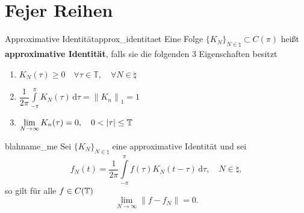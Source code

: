 \section{Fejer Reihen}

\begin{boringDef}{Approximative Identität}{approx_identitaet}
  Eine Folge ${\{K_{N}\}}_{N\in\natural} \subset C(\pi)$ heißt \textbf{approximative Identität}, falls sie die folgenden 3 Eigenschaften besitzt
  \begin{enumerate}
          \item $K_{N}(\tau) \geq 0 \quad \forall \tau\in\mathbb{T}, \quad \forall N \in \natural$
          \item $\dfrac{1}{2\pi} \int\limits_{-\pi}^{\pi} K_{N}(\tau) \, \mathrm{d}\tau = {\|K_{n}\|}_{1} = 1$
          \item $\lim\limits_{N\to\infty} K_{n}(\tau) = 0, \quad 0 < |\tau| \leq \mathbb{T}$
  \end{enumerate}
\end{boringDef}

\begin{mytheo}{blah}{name_me}
  Sei ${\{K_{N}\}}_{N\in\natural}$ eine approximative Identität und sei
  \begin{equation*}
    f_{N}(t) = \dfrac{1}{2\pi} \int\limits_{-\pi}^{\pi} f(\tau) K_{N}(t - \tau) \, \mathrm{d}\tau, \quad N \in \natural,
  \end{equation*}
  so gilt für alle $f \in C(\mathbb{T})$
  \begin{equation*}
    \lim\limits_{N\to\infty} \|f - f_{N}\| = 0.
  \end{equation*}
\end{mytheo}
